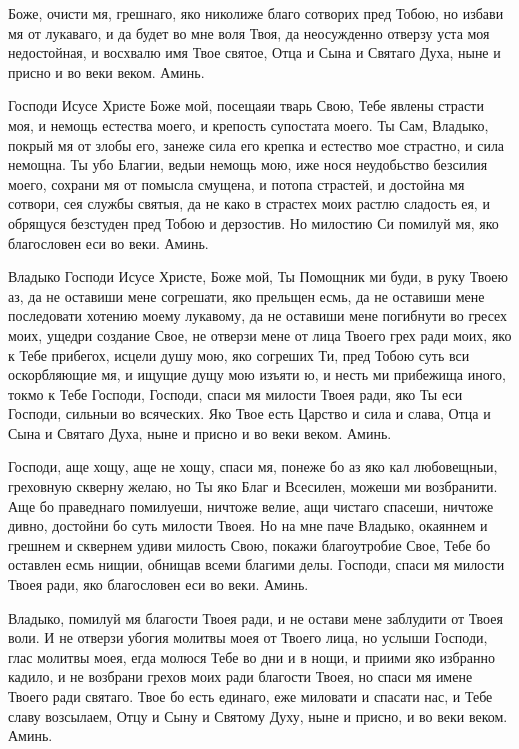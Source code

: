 
Боже, очисти мя, грешнаго, яко николиже благо сотворих пред Тобою, но избави мя от лукаваго, и да будет во мне воля Твоя, да неосужденно отверзу уста моя недостойная, и восхвалю имя Твое святое, Отца и Сына и Святаго Духа, ныне и присно и во веки веком. Аминь.



Господи Исусе Христе Боже мой, посещаяи тварь Свою, Тебе явлены страсти моя, и немощь естества моего, и крепость супостата моего. Ты Сам, Владыко, покрый мя от злобы его, занеже сила его крепка и естество мое страстно, и сила немощна. Ты убо Благии, ведыи немощь мою, иже нося неудобьство безсилия моего, сохрани мя от помысла смущена, и потопа страстей, и достойна мя сотвори, сея службы святыя, да не како в страстех моих растлю сладость ея, и обрящуся безстуден пред Тобою и дерзостив. Но милостию Си помилуй мя, яко благословен еси во веки. Аминь.



Владыко Господи Исусе Христе, Боже мой, Ты Помощник ми буди, в руку Твоею аз, да не оставиши мене согрешати, яко прельщен есмь, да не оставиши мене последовати хотению моему лукавому, да не оставиши мене погибнути во гресех моих, ущедри создание Свое, не отверзи мене от лица Твоего грех ради моих, яко к Тебе прибегох, исцели душу мою, яко согреших Ти, пред Тобою суть вси оскорбляющие мя, и ищущие дущу мою изъяти ю, и несть ми прибежища иного, токмо к Тебе Господи, Господи, спаси мя милости Твоея ради, яко Ты еси Господи, сильныи во всяческих. Яко Твое есть Царство и сила и слава, Отца и Сына и Святаго Духа, ныне и присно и во веки веком. Аминь.



Господи, аще хощу, аще не хощу, спаси мя, понеже бо аз яко кал любовещныи, греховную скверну желаю, но Ты яко Благ и Всесилен, можеши ми возбранити. Аще бо праведнаго помилуеши, ничтоже велие, ащи чистаго спасеши, ничтоже дивно, достойни бо суть милости Твоея. Но на мне паче Владыко, окаяннем и грешнем и сквернем удиви милость Свою, покажи благоутробие Свое, Тебе бо оставлен есмь нищии, обнищав всеми благими делы. Господи, спаси мя милости Твоея ради, яко благословен еси во веки. Аминь.



Владыко, помилуй мя благости Твоея ради, и не остави мене заблудити от Твоея воли. И не отверзи убогия молитвы моея от Твоего лица, но услыши Господи, глас молитвы моея, егда молюся Тебе во дни и в нощи, и приими яко избранно кадило, и не возбрани грехов моих ради благости Твоея, но спаси мя имене Твоего ради святаго. Твое бо есть единаго, еже миловати и спасати нас, и Тебе славу возсылаем, Отцу и Сыну и Святому Духу, ныне и присно, и во веки веком. Аминь.


